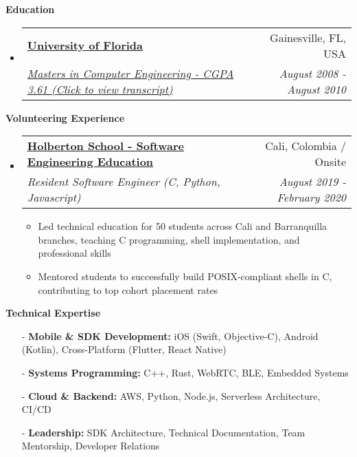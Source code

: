 \documentclass[letterpaper,11pt]{article}
\makeatletter
\newcommand{\resitem}[1]{\item #1 \vspace{-2pt}}
\newcommand{\resheading}[1]{{\large \colorbox{mygrey}{\begin{minipage}{\textwidth}{\textbf{#1 \vphantom{p\^{E}}}}\end{minipage}}}}
\newcommand{\ressubheading}[4]{
\begin{tabular*}{7.0in}{l@{\extracolsep{\fill}}r}
    \textbf{#1} & #2 \\
    \textit{#3} & \textit{#4} \\
\end{tabular*}\vspace{-6pt}}
\makeatother
\begin{document}
\vspace{0.2in}
  
\resheading{Education}
\begin{itemize}
\item
    \ressubheading{\href{https://bit.ly/4a2uloZ}{University of Florida}}{Gainesville, FL, USA}{\href{https://bit.ly/4a2uloZ}{Masters in Computer Engineering - CGPA 3.61 (Click to view transcript)}}{August 2008 - August 2010}
    \end{itemize}

\vspace{0.2in}

\resheading{Volunteering Experience}
\begin{itemize}
\item
    \ressubheading{\href{https://www.holbertonschool.com/}{Holberton School - Software Engineering Education}}{Cali, Colombia / Onsite}{Resident Software Engineer (C, Python, Javascript)}{August 2019 - February 2020}
    \begin{itemize}
        \resitem{Led technical education for 50 students across Cali and Barranquilla branches, teaching C programming, shell implementation, and professional skills}
        \resitem{Mentored students to successfully build POSIX-compliant shells in C, contributing to top cohort placement rates}
    \end{itemize}
\end{itemize}

\resheading{Technical Expertise}
\begin{itemize}
    \item[-] \textbf{Mobile \& SDK Development:} iOS (Swift, Objective-C), Android (Kotlin), Cross-Platform (Flutter, React Native)
    \item[-] \textbf{Systems Programming:} C++, Rust, WebRTC, BLE, Embedded Systems
    \item[-] \textbf{Cloud \& Backend:} AWS, Python, Node.js, Serverless Architecture, CI/CD
    \item[-] \textbf{Leadership:} SDK Architecture, Technical Documentation, Team Mentorship, Developer Relations
\end{itemize}
\end{document}
